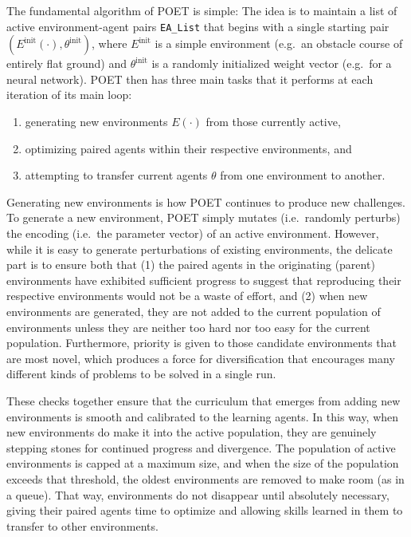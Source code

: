 \documentclass{article}
\newcommand{\jc}[1]{\comments{\textcolor{deepForestGreen}{[JC: #1]}}}
\newcommand{\comments}[1]{#1}
\begin{document}
The fundamental algorithm of POET is simple:  The idea is to maintain a list of active environment-agent pairs \texttt{EA\_List} that begins with a single starting pair  $(E^{\textrm{init}}(\cdot),\theta^{\textrm{init}})$, where $E^{\textrm{init}}$ is a simple environment (e.g.\ an obstacle course of entirely flat ground) and $\theta^{\textrm{init}}$ is a randomly initialized weight vector (e.g.\ for a neural network).  POET then has three main tasks that it performs at each iteration of its main loop: 

\begin{enumerate}
    \item generating new environments $E(\cdot)$ from those currently active, 
    \item optimizing paired agents within their respective environments, and 
    \item attempting to transfer current agents $\theta$ from one environment to another.  
\end{enumerate}

Generating new environments is how POET continues to produce new challenges.  To generate a new environment, POET simply mutates (i.e.\ randomly perturbs) the encoding (i.e.\ the parameter vector) of an active environment.  However, while it is easy to generate perturbations of existing environments, the delicate part is to ensure both that (1) the paired agents in the originating (parent) environments have exhibited sufficient progress to suggest that reproducing their respective environments would not be a waste of effort, and (2) when new environments are generated, they are not added to the current population of environments unless they are neither too hard nor too easy for the current population. %
Furthermore, priority is given to those candidate environments that are most novel, which produces a force for diversification that encourages many different kinds of problems to be solved in a single run.

These checks together ensure that the curriculum that emerges from adding new environments is smooth and calibrated to the learning agents.  In this way, when new environments do make it into the active population, they are genuinely stepping stones for continued progress and divergence.  The population of active environments is capped at a maximum size, and when the size of the population exceeds that threshold, the oldest environments are removed to make room (as in a queue).  That way, environments do not disappear until absolutely necessary, giving their paired agents time to optimize and allowing skills learned in them to transfer to other environments.
\end{document}
